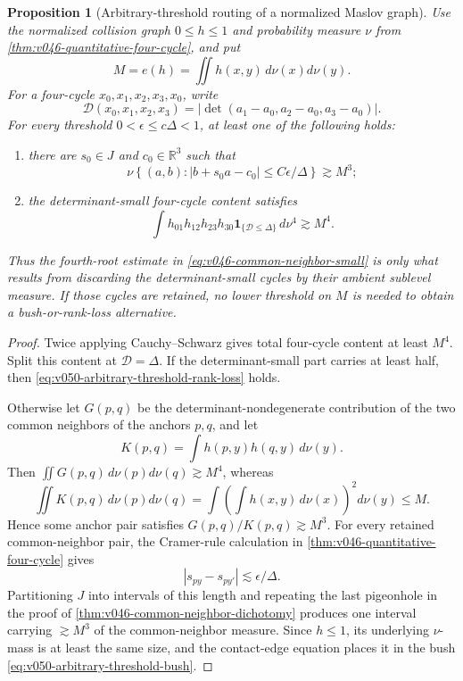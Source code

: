 \documentclass[10pt]{article}
\newtheorem{proposition}[theorem]{Proposition}
\begin{document}
\begin{proposition}[Arbitrary-threshold routing of a normalized Maslov graph]
\label{prop:v050-arbitrary-threshold-maslov-routing}
Use the normalized collision graph \(0\le h\le1\) and probability measure \(\nu\) from
\cref{thm:v046-quantitative-four-cycle}, and put
\[
M=e(h)=\iint h(x,y)\,d\nu(x)d\nu(y).
\]
For a four-cycle \(x_0,x_1,x_2,x_3,x_0\), write
\[
\mathcal D(x_0,x_1,x_2,x_3)
=
\left|
\det(a_1-a_0,a_2-a_0,a_3-a_0)
\right|.
\]
For every threshold \(0<\epsilon\le c\Delta<1\), at least one of the following holds:
\begin{enumerate}[label=\textnormal{(\roman*)}]
\item there are \(s_0\in J\) and \(c_0\in\mathbb R^3\) such that
\begin{equation}
\label{eq:v050-arbitrary-threshold-bush}
\boxed{
\nu\left\{(a,b):|b+s_0a-c_0|\le C\epsilon/\Delta\right\}
\gtrsim M^3;
}
\end{equation}
\item the determinant-small four-cycle content satisfies
\begin{equation}
\label{eq:v050-arbitrary-threshold-rank-loss}
\boxed{
\int
h_{01}h_{12}h_{23}h_{30}
\mathbf 1_{\{\mathcal D\le\Delta\}}
\,d\nu^4
\gtrsim M^4.
}
\end{equation}
\end{enumerate}
Thus the fourth-root estimate in
\eqref{eq:v046-common-neighbor-small} is only what results from discarding the determinant-small
cycles by their ambient sublevel measure.  If those cycles are retained, no lower threshold on
\(M\) is needed to obtain a bush-or-rank-loss alternative.
\end{proposition}

\begin{proof}
Twice applying Cauchy--Schwarz gives total four-cycle content at least \(M^4\).  Split this content
at \(\mathcal D=\Delta\).  If the determinant-small part carries at least half, then
\eqref{eq:v050-arbitrary-threshold-rank-loss} holds.

Otherwise let \(G(p,q)\) be the determinant-nondegenerate contribution of the two common neighbors
of the anchors \(p,q\), and let
\[
K(p,q)=\int h(p,y)h(q,y)\,d\nu(y).
\]
Then \(\iint G(p,q)\,d\nu(p)d\nu(q)\gtrsim M^4\), whereas
\[
\iint K(p,q)\,d\nu(p)d\nu(q)
=
\int\left(\int h(x,y)\,d\nu(x)\right)^2d\nu(y)
\le M.
\]
Hence some anchor pair satisfies \(G(p,q)/K(p,q)\gtrsim M^3\).  For every retained common-neighbor
pair, the Cramer-rule calculation in
\cref{thm:v046-quantitative-four-cycle} gives
\[
|s_{py}-s_{py'}|
\lesssim
\epsilon/\Delta.
\]
Partitioning \(J\) into intervals of this length and repeating the last pigeonhole in the proof of
\cref{thm:v046-common-neighbor-dichotomy} produces one interval carrying
\(\gtrsim M^3\) of the common-neighbor measure.  Since \(h\le1\), its underlying \(\nu\)-mass is at
least the same size, and the contact-edge equation places it in the bush
\eqref{eq:v050-arbitrary-threshold-bush}.
\end{proof}
\end{document}
